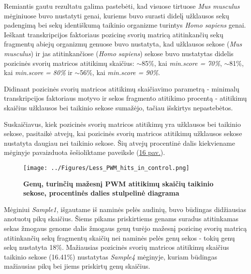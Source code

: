 \documentclass[12pt]{article}
\begin{document}
Remiantis gautu rezultatu galima pastebėti, kad visuose tirtuose
\emph{Mus musculus} mėginiuose buvo nustatyti genai, kuriems buvo surasti didelį
užklausos sekų padengimą bei sekų identiškumą taikinio organizme turintys
\emph{Homo sapiens} genai. Ieškant transkripcijos faktoriaus pozicinę svorių
matricą atitinkančių sekų fragmentų abiejų organizmų genuose buvo nustatyta,
kad užklausos sekose (\emph{Mus musculus}) ir jas atitinkančiose
(\emph{Homo sapiens}) sekose buvo nustatytas didelis pozicinės svorių matricos
atitikimų skaičius: \(\sim\)85\%, kai \emph{min.score = 70\%}, \(\sim\)81\%,
kai \emph{min.score = 80\%} ir \(\sim\)56\%, kai \emph{min.score = 90\%}.

Didinant pozicinės svorių matricos atitikimų skaičiavimo parametrą - minimalų
transkripcijos faktoriaus motyvo ir sekos fragmento atitikimo procentą - 
atitikimų skaičius užklausos bei taikinio sekose sumažėjo, tačiau išskirtys
nepastebėtos.

Suskaičiavus, kiek pozicinės svorių matricos atitikimų yra užklausos bei
taikinio sekose, pasitaikė atvejų, kai pozicinės svorių matricos atitikimų
užklausos sekose nustatyta daugiau nei taikinio sekose. Šių atvejų procentinė
dalis kiekviename mėginyje pavaizduota šešioliktame paveiksle
(\hyperref[fig:image16]{16 pav.}).

\begin{figure}[ht]
    \begin{center}
        \captionsetup{justification=centering}
        \texttt{[image: ../Figures/Less\_PWM\_hits\_in\_control.png]}
        \vspace{-1.5\baselineskip}
        \caption{\small\textbf{Genų, turinčių mažesnį PWM atitikimų 
                                skaičių taikinio sekose, procentinės dalies
                                stulpelinė diagrama}}
        \label{fig:image16}
    \end{center}
\end{figure}

Mėginiui \emph{Sample1}, išgautame iš naminės pelės audinių, buvo būdingas
didžiausias anotuotų pikų skaičius. Šiems pikams priskirtiems genams suradus
atitinkamas sekas žmogaus genome dalis žmogaus genų turėjo
mažesnį pozicinę svorių matricą atitinkančių sekų fragmentų skaičių nei
naminės pelės genų sekos - tokių genų sekų nustatyta 18\%. Mažiausias pozicinės
svorių matricos atitikimų skaičius taikinio sekose (16.41\%) nustatytas
\emph{Sample4} mėginyje, kuriam būdingas mažiausias pikų bei jiems priskirtų
genų skaičius.
\end{document}
